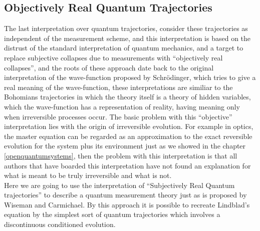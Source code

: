 \subsection*{Objectively Real Quantum Trajectories}
The last interpretation over quantum trajectories, consider these trajectories as independent of the measurement scheme, and this interpretation is based on the distrust of the standard interpretation of quantum mechanics, and a target to replace subjective collapses due to measurements with ``objectively real collapses'', and the roots of these approach date back to the original interpretation of the wave-function proposed by Schr\"odinger, which tries to give a real meaning of the wave-function, these interpretations are similiar to the Bohomians\cite{PratimKumar} trajectories in which the theory itself is a theory of hidden variables, which the wave-function has a representation of reality, having meaning only when irreversible processes occur. The basic problem with this ``objective'' interpretation lies with the origin of irreversible evolution. For example in optics, the master equation can be regarded as an approximation to the exact reversible evolution for the system plus its environment just as we showed in the chapter \ref{openquantumsystems}, then the problem with this interpretation is that all authors that have boarded this interpretation have not found an explanation for what is meant to be truly irreversible and what is not.\\

Here we are going to use the interpretation of ``Subjectively Real Quantum trajectories''  to describe a quantum measurement theory just as is proposed by Wiseman and Carmichael. By this approach it is possible to recreate Lindblad's equation by the simplest sort of quantum trajectories which involves a discontinuous conditioned evolution. 
